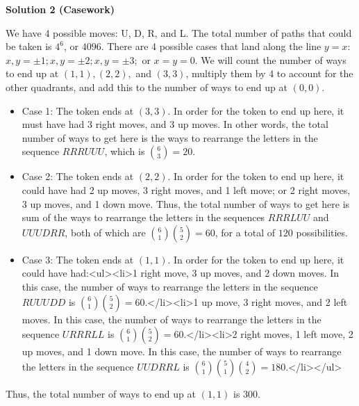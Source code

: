 \begin{enumerate}
 


 



\textbf{Solution 2 (Casework)}

We have 4 possible moves: U, D, R, and L. The total number of paths that could be taken is $4^6$, or $4096$. There are 4 possible cases that land along the line $y = x$: $x,y = \pm 1; x,y = \pm 2; x,y = \pm 3;$ or $x = y = 0$. We will count the number of ways to end up at $(1,1), (2,2),$ and $(3,3)$, multiply them by 4 to account for the other quadrants, and add this to the number of ways to end up at $(0,0)$.

 
            \begin{itemize}
        \item Case 1: The token ends at $(3, 3)$. In order for the token to end up here, it must have had 3 right moves, and 3 up moves. In other words, the total number of ways to get here is the ways to rearrange the letters in the sequence $RRRUUU$, which is ${6\choose 3} = 20.$
            \end{itemize}
            
            \begin{itemize}
        \item Case 2: The token ends at $(2,2)$. In order for the token to end up here, it could have had 2 up moves, 3 right moves, and 1 left move; or 2 right moves, 3 up moves, and 1 down move. Thus, the total number of ways to get here is sum of the ways to rearrange the letters in the sequences $RRRLUU$ and $UUUDRR$, both of which are ${6\choose 1}{5\choose 2} = 60$, for a total of $120$ possibilities.
            \end{itemize}
            
            \begin{itemize}
        \item Case 3: The token ends at $(1,1)$. In order for the token to end up here, it could have had:<ul><li>1 right move, 3 up moves, and 2 down moves. In this case, the number of ways to rearrange the letters in the sequence $RUUUDD$ is ${6\choose 1}{5\choose 2} = 60.$</li><li>1 up move, 3 right moves, and 2 left moves. In this case, the number of ways to rearrange the letters in the sequence $URRRLL$ is ${6\choose 1}{5\choose 2} = 60.$</li><li>2 right moves, 1 left move, 2 up moves, and 1 down move. In this case, the number of ways to rearrange the letters in the sequence $UUDRRL$ is ${6\choose 1}{5\choose 1}{4\choose 2} = 180.$</li></ul>
            \end{itemize}
            Thus, the total number of ways to end up at $(1,1)$ is $300$.


\end{enumerate}
